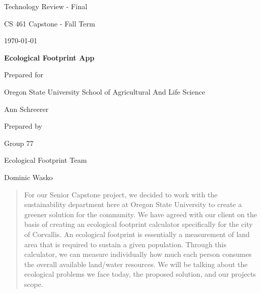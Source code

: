 \documentclass[onecolumn, draftclsnofoot,10pt, compsoc]{IEEEtran}
\def \GroupMemberOne{			Dominic Wasko}
\def \CapstoneProjectName{		Ecological Footprint App}
\def \CapstoneSponsorCompany{	Oregon State University School of Agricultural And Life Science}
\def \CapstoneSponsorPerson{		Ann Schreerer}
\def \DocType{Technology Review - Final}
\def \CapstoneTeamNumber{		77}
\def \CapstoneTeamName{		Ecological Footprint Team}
\newcommand{\NameSigPair}[1]{\par
\makebox[2.75in][r]{#1} \hfil 	\makebox[3.25in]{\makebox[2.25in]{\hrulefill} \hfill		\makebox[.75in]{\hrulefill}}
\par\vspace{-12pt} \textit{\tiny\noindent
\makebox[2.75in]{} \hfil		\makebox[3.25in]{\makebox[2.25in][r]{Signature} \hfill	\makebox[.75in][r]{Date}}}}
\renewcommand{\NameSigPair}[1]{#1}
\begin{document}
\begin{titlepage}
    \begin{singlespace}
        \hfill 
        \par\vspace{.2in}
        \centering
        \scshape{
	 \huge \DocType \par
            \huge CS 461 Capstone - Fall Term \par
            {\large\today}\par
            \vspace{.5in}
            \textbf{\Huge\CapstoneProjectName}\par
            \vfill
            {\large Prepared for}\par
            \Huge \CapstoneSponsorCompany\par
            \vspace{5pt}
            {\Large\NameSigPair{\CapstoneSponsorPerson}\par}
            {\large Prepared by }\par
            Group\CapstoneTeamNumber\par
            \CapstoneTeamName\par 
            
            \vspace{5pt}
            {\Large
                \NameSigPair{\GroupMemberOne}\par
            }
            \vspace{20pt}
        }
        \begin{abstract}
        	For our Senior Capstone project, we decided to work with the sustainability department here at Oregon State University to create a greener solution for the community. 
	We have agreed with our client on the basis of creating an ecological footprint calculator specifically for the city of Corvallis.
	An ecological footprint is essentially a measurement of land area that is required to sustain a given population. 
	Through this calculator, we can measure individually how much each person consumes the overall available land/water resources. 
	We will be talking about the ecological problems we face today, the proposed solution, and our projects scope.
        \end{abstract}     
    \end{singlespace}
\end{titlepage}
\newpage
{}
\tableofcontents
\listoffigures
\listoftables
\clearpage
\end{document}
